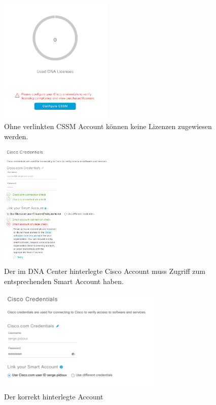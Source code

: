 \begin{figure}[H]
	\centering
	\includegraphics[height=6cm]{img/Selection_006.png}
	\caption{Ohne verlinkten CSSM Account können keine Lizenzen zugewiesen werden.}
	\label{fig:dna-center-licence-3}
\end{figure}

\begin{figure}[H]
	\centering
	\includegraphics[height=6cm]{img/Selection_008.png}
	\caption{Der im DNA Center hinterlegte Cisco Account muss Zugriff zum entsprechenden Smart Account haben.}
	\label{fig:dna-center-licence-4}
\end{figure}

\begin{figure}[H]
	\centering
	\includegraphics[height=5cm]{img/LicenceManager_002.png}
	\caption{Der korrekt hinterlegte Account}
	\label{fig:dna-center-licence-5}
\end{figure}

